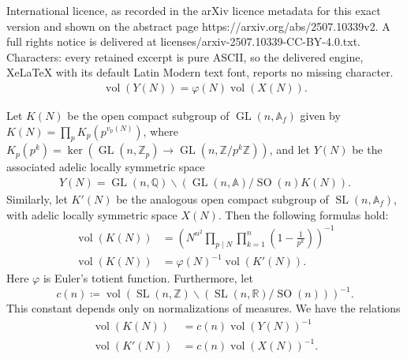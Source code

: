 \documentclass[10pt,a4paper]{amsart}
\newcommand{\A}{\mathbb{A}}
\newcommand{\GL}{\operatorname{GL}}
\newcommand{\Q}{\mathbb{Q}}
\newcommand{\R}{\mathbb{R}}
\newcommand{\SL}{\operatorname{SL}}
\newcommand{\SO}{\operatorname{SO}}
\newcommand{\Z}{\mathbb{Z}}
\newcommand{\vol}{\operatorname{vol}}
\renewcommand{\ker}{\operatorname{ker}}
\renewcommand{\phi}{\varphi}
\begin{document}
International licence, as recorded in the arXiv licence metadata for this exact version and shown on the abstract page https://arxiv.org/abs/2507.10339v2. A full rights notice is delivered at licenses/arxiv-2507.10339-CC-BY-4.0.txt. Characters: every retained excerpt is pure ASCII, so the delivered engine, XeLaTeX with its default Latin Modern text font, reports no missing character.
\begin{align}\label{volglsl}
    \vol(Y(N)) = \phi(N)\vol(X(N)).
\end{align}

\begin{prop}
    Let $K(N)$ be the open compact subgroup of $\GL(n,\A_f)$ given by $K(N) = \prod_p K_p(p^{v_p(N)})$, where $K_p(p^k)=\ker(\GL(n,\Z_p)\to \GL(n,\Z/p^k\Z))$, and let $Y(N)$ be the associated adelic locally symmetric space
    \begin{align*}
        Y(N) = \GL(n,\Q)\backslash (\GL(n,\A)/\SO(n)K(N)).
    \end{align*} 
    Similarly, let $K'(N)$ be the analogous open compact subgroup of $\SL(n,\A_f)$, with adelic locally symmetric space $X(N)$. Then the following formulas hold:
    \begin{align}
        \label{volformula}\vol(K(N)) &= \left(N^{n^2}\prod_{p\mid N}\prod_{k=1}^{n}\left(1-\frac{1}{p^k}\right)\right)^{-1}\\
        \label{relatevol}\vol(K(N)) &= \phi(N)^{-1}\vol(K'(N)).
    \end{align}
    Here $\phi$ is Euler's totient function. Furthermore, let
    $$c(n)\coloneqq \vol(\SL(n,\Z)\backslash(\SL(n,\R)/\SO(n)))^{-1}.$$
    This constant depends only on normalizations of measures. We have the relations
    \begin{align}
        \label{GLnspacevol}\vol(K(N)) &= c(n) \vol(Y(N))^{-1}\\
        \label{SLnspacevol}\vol(K'(N)) &= c(n) \vol(X(N))^{-1}.
    \end{align}
\end{prop}
\end{document}
